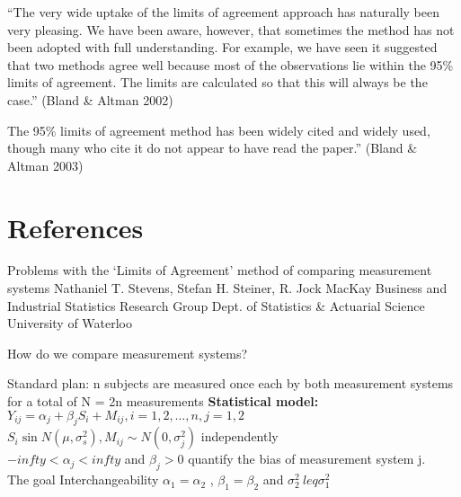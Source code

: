 \documentclass[MAIN.tex]{subfiles}
\begin{document}
 “The very wide uptake of the limits of agreement approach has naturally been very pleasing.
We have been aware, however, that sometimes the method has not been adopted with full
understanding. For example, we have seen it suggested that two methods agree well
because most of the observations lie within the 95\% limits of agreement. The limits are
calculated so that this will always be the case.” (Bland \& Altman 2002)

The 95\% limits of agreement method has been widely cited and widely used, though many
who cite it do not appear to have read the paper.” (Bland \& Altman 2003)

\section{References}
Problems with the ‘Limits of Agreement’
method of comparing measurement systems
Nathaniel T. Stevens, Stefan H. Steiner, R. Jock MacKay
Business and Industrial Statistics Research Group
Dept. of Statistics \& Actuarial Science
University of Waterloo



How do we compare measurement systems?


Standard plan: n subjects are measured once each by both measurement systems for a total
of N = 2n measurements
\textbf{Statistical model:}
\\$Y_{ij} = \alpha_j + \beta_jS_i+M_{ij}, i=1,2,\ldots,n, j=1,2$
\\ $S_i \sin N(\mu, \sigma^2_s), M_{ij} \sim N(0,\sigma^2_j) $ independently
\\$ -infty < \alpha_j < infty$ and $\beta_j>0$ quantify the bias of measurement system j.
\\ The goal
Interchangeability $\alpha_1 = \alpha_2$ , $\beta_1 = \beta_2$ and $\sigma^2_2 \ leq \sigma^2_1$


\end{document}
